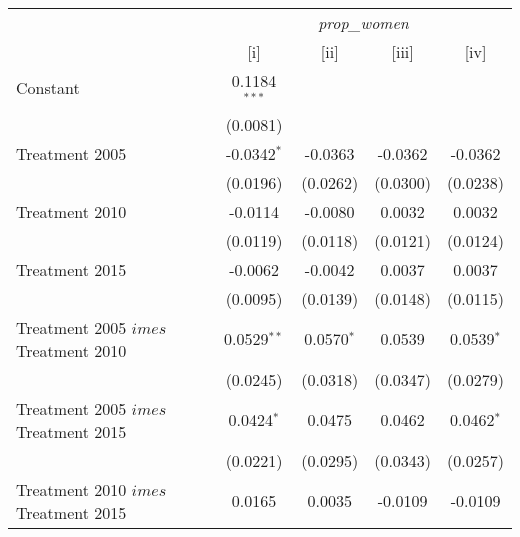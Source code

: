 
\begingroup
\centering
\begin{tabular}{lcccc}
   \toprule
    & \multicolumn{4}{c}{\textit{prop\_women}}\\
                                                                     & [i]            & [ii]          & [iii]         & [iv]\\  
   \midrule 
   Constant                                                          & 0.1184$^{***}$ &               &               &   \\   
                                                                     & (0.0081)       &               &               &   \\   
   Treatment 2005                                                    & -0.0342$^{*}$  & -0.0363       & -0.0362       & -0.0362\\   
                                                                     & (0.0196)       & (0.0262)      & (0.0300)      & (0.0238)\\   
   Treatment  2010                                                   & -0.0114        & -0.0080       & 0.0032        & 0.0032\\   
                                                                     & (0.0119)       & (0.0118)      & (0.0121)      & (0.0124)\\   
   Treatment 2015                                                    & -0.0062        & -0.0042       & 0.0037        & 0.0037\\   
                                                                     & (0.0095)       & (0.0139)      & (0.0148)      & (0.0115)\\   
   Treatment 2005 $	imes $ Treatment  2010                          & 0.0529$^{**}$  & 0.0570$^{*}$  & 0.0539        & 0.0539$^{*}$\\   
                                                                     & (0.0245)       & (0.0318)      & (0.0347)      & (0.0279)\\   
   Treatment 2005 $	imes $ Treatment 2015                           & 0.0424$^{*}$   & 0.0475        & 0.0462        & 0.0462$^{*}$\\   
                                                                     & (0.0221)       & (0.0295)      & (0.0343)      & (0.0257)\\   
   Treatment  2010 $	imes $ Treatment 2015                          & 0.0165         & 0.0035        & -0.0109       & -0.0109\\   

\end{tabular}
